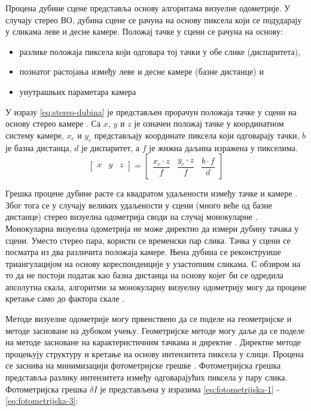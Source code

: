 \documentclass[12pt]{article}
\begin{document}
Процена дубине сцене представља основу алгоритама визуелне одометрије. У
случају стерео ВО, дубина сцене се рачуна на основу пиксела који се подударају
у сликама леве и десне камере. Положај тачке у сцени се рачуна на основу:
\begin{itemize}
	\item разлике положаја пиксела који одговара тој тачки у обе слике (диспаритета),
	\item познатог растојања између леве и десне камере (базне дистанце) и
	\item унутрашњих параметара камера
\end{itemize}

У изразу \eqref{eq:stereo-dubina} је представљен прорачун положаја тачке у
сцени на основу стерео камере \cite{kostavelis2016stereo}. Са $x$, $y$ и $z$ је
означен положај тачке у координатном систему камере, $x_c$ и $y_c$ представљају
координате пиксела који одговарају тачки, $b$ је базна дистанца, $d$ је
диспаритет, а $f$ је жижна даљина изражена у пикселима.
\begin{equation}
	\begin{bmatrix} x & y & z \end{bmatrix}
	= \begin{bmatrix} \dfrac{x_c \cdot z}{f} & \dfrac{y_c \cdot z}{f} & \dfrac{b \cdot f}{d} \end{bmatrix}
	\label{eq:stereo-dubina}
\end{equation}

Грешка процене дубине расте са квадратом удаљености између тачке и камере
\cite{khoshelham2012accuracy}. Због тога се у случају великих удаљености у
сцени (много веће од базне дистанце) стерео визуелна одометрија своди на случај
монокуларне \cite{scaramuzza2011visual}. Монокуларна визуелна одометрија не
може директно да измери дубину тачака у сцени. Уместо стерео пара, користи се
временски пар слика. Тачка у сцени се посматра из два различита положаја
камере. Њена дубина се реконструише триангулацијом на основу кореспонденције у
узастопним сликама. С обзиром на то да не постоји податак као базна дистанца на
основу којег би се одредила апсолутна скала, алгоритми за монокуларну визуелну
одометрију могу да процене кретање само до фактора скале
\cite{scaramuzza2011visual}.

Методе визуелне одометрије могу првенствено да се поделе на геометријске и
методе засноване на дубоком учењу. Геометријске методе могу даље да се поделе
на методе засноване на карактеристичним тачкама и директне
\cite{duan2019dlvslam}. Директне методе процењују структуру и кретање на основу
интензитета пиксела у слици. Процена се заснива на минимизацији фотометријске
грешке \cite{forster2014svo}. Фотометријска грешка представља разлику
интензитета између одговарајућих пиксела у пару слика. Фотометријска грешка
$\delta I$ је представљена у изразима \eqref{eq:fotometrijska-1} -
\eqref{eq:fotometrijska-3}:
\end{document}
